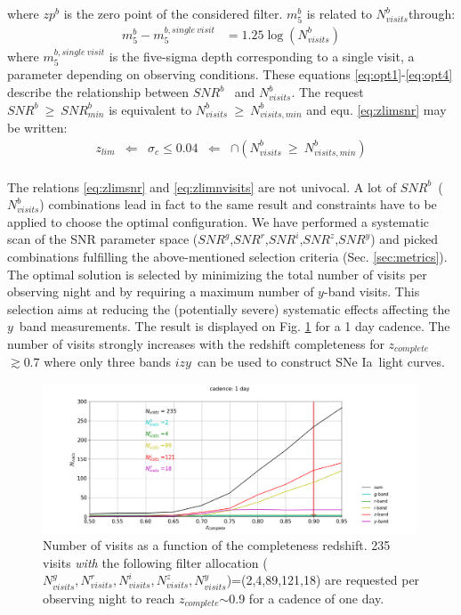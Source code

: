 \documentclass[\docopts]{\docclass}
\newcommand{\snrb}{\mbox{$SNR^b$}}
\newcommand{\snrbmin}{\mbox{$SNR^b_{min}$}}
\newcommand{\snrg}{\mbox{$SNR^g$}}
\newcommand{\snrr}{\mbox{$SNR^r$}}
\newcommand{\snri}{\mbox{$SNR^i$}}
\newcommand{\snrz}{\mbox{$SNR^z$}}
\newcommand{\snry}{\mbox{$SNR^y$}}
\newcommand{\bi}{{$i$}}
\newcommand{\bz}{{$z$}}
\newcommand{\by}{{$y$}}
\newcommand{\sigc}{\mbox{$\sigma_c$}}
\newcommand{\zlim}{\mbox{$z_{lim}$}}
\newcommand{\sne}{{SNe Ia}}
\newcommand{\zcomp}{\mbox{$z_{complete}$}}
\newcommand{\seq}{$\sim$}
\newcommand{\nvisitsb}{\mbox{$N_{visits}^b$}}
\newcommand{\nvisitsbmin}{\mbox{$N_{visits,min}^b$}}
\newcommand{\nvisitsall}{$N_{visits}^g,N_{visits}^r,N_{visits}^i,N_{visits}^z,N_{visits}^y$}
\begin{document}
where $zp^b$ is the zero point of the considered filter.  $m_5^b$ is related to \nvisitsb through:
\begin{equation}
  \begin{aligned}
    m_5^b - m_5^{b, single~visit} & =  1.25 \log(N_{visits}^b)
    \end{aligned}
  \label{eq:opt4}
\end{equation}
where $m_5^{b, single~visit}$ is the five-sigma depth corresponding to a single visit, a parameter depending on observing conditions. These equations \eqref{eq:opt1}-\eqref{eq:opt4} describe the relationship between \snrb~ and \nvisitsb. The request $\snrb~\geq~\snrbmin$ is equivalent to $\nvisitsb~\geq~\nvisitsbmin$ and equ. \eqref{eq:zlimsnr} may be written:
\begin{equation}
  \begin{aligned}
    \zlim &\Longleftarrow & \sigc \leq 0.04 & \Longleftarrow &\cap (\nvisitsb~\geq~\nvisitsbmin)
    \end{aligned}
 \label{eq:zlimnvisits}
\end{equation}
\\
The relations \eqref{eq:zlimsnr} and \eqref{eq:zlimnvisits} are not univocal. A lot of \snrb~(\nvisitsb) combinations lead in fact to the same result and constraints have to be applied to choose the optimal configuration. We have performed a systematic scan of the SNR parameter space (\snrg,\snrr,\snri,\snrz,\snry) and picked combinations fulfilling the above-mentioned selection criteria (Sec. \ref{sec:metrics}). The optimal solution is selected by minimizing the total number of visits per observing night and by requiring a maximum number of \by-band visits. This selection aims at reducing the (potentially severe) systematic effects affecting the \by~band measurements. The result is displayed on Fig. \ref{fig:nvisits_zlim} for a 1 day cadence. The number of visits strongly increases with the redshift completeness for \zcomp$\gtrsim 0.7$ where only three bands \bi\bz\by~can be used to construct \sne~light curves.

\begin{figure}[htbp]
\begin{center}
  \includegraphics[width=0.99\textwidth]{nvisits_zlim.png}
 \caption{Number of visits as a function of the completeness redshift. 235 visits {\it with} the following filter allocation (\nvisitsall)=(2,4,89,121,18) are requested per observing night to reach \zcomp\seq0.9 for a cadence of one day.}\label{fig:nvisits_zlim}
\end{center}
\end{figure}
\end{document}
